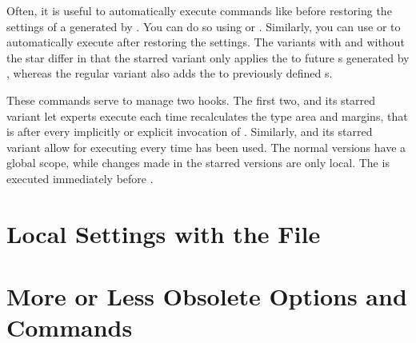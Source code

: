 Often, it is useful to automatically
execute commands like  before
restoring the settings of a  generated by .
You can do so using  or .
Similarly, you can use  or 
to automatically execute  after restoring the settings. The
variants with and without the star differ in that the starred variant only
applies the  to future s generated by
, whereas the regular variant also adds the  to
previously defined s.%
\EndIndexGroup


\begin{Declaration}
\end{Declaration}%
These commands serve to manage two hooks. The first two,
 and its starred variant let experts execute
 each time  recalculates the type area and
margins, that is after every implicitly or explicit invocation of
. Similarly,
 and its starred
variant allow for executing  every time
 has been used. The normal versions have a
global scope, while changes made in the starred versions are only local. The
 is executed immediately before .%
% 
\EndIndexGroup


\section{Local Settings with the  File}
\BeginIndexGroup
{}

%
\EndIndexGroup

\section{More or Less Obsolete Options and Commands}
%
\EndIndexGroup

\endinput

